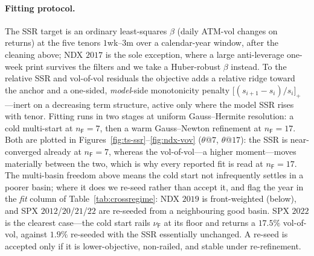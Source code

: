 \documentclass[11pt]{article}
\begin{document}
\paragraph{Fitting protocol.} The SSR target is an ordinary least-squares $\beta$ (daily ATM-vol changes on
returns) at the five tenors $1$wk--$3$m over a calendar-year window, after the cleaning above; NDX $2017$ is the
sole exception, where a large anti-leverage one-week print survives the filters and we take a Huber-robust
$\beta$ instead. To the relative SSR and vol-of-vol residuals the objective adds a relative ridge toward the
anchor and a one-sided, \emph{model}-side monotonicity penalty $\big[(s_{i+1}-s_i)/s_i\big]_+$---inert on a
decreasing term structure, active only where the model SSR rises with tenor. Fitting runs in two stages at
uniform Gauss--Hermite resolution: a cold multi-start at $n_{\mathsf F}{=}7$, then a warm Gauss--Newton
refinement at $n_{\mathsf F}{=}17$. Both are plotted in Figures~\ref{fig:ts-ssr}--\ref{fig:ndx-vov}
($\theta$@$7$, $\theta$@$17$): the SSR is near-converged already at $n_{\mathsf F}{=}7$, whereas the
vol-of-vol---a higher moment---moves materially between the two, which is why every reported fit is read at
$n_{\mathsf F}{=}17$. The multi-basin freedom above means the cold start not infrequently settles in a poorer
basin; where it does we re-seed rather than accept it, and flag the year in the \emph{fit} column of
Table~\ref{tab:crossregime}: NDX $2019$ is front-weighted (below), and SPX $2012$/$20$/$21$/$22$ are re-seeded
from a neighbouring good basin. SPX $2022$ is the clearest case---the cold start rails $\nu_{\mathsf F}$ at its
floor and returns a $17.5\%$ vol-of-vol, against $1.9\%$ re-seeded with the SSR essentially unchanged. A re-seed
is accepted only if it is lower-objective, non-railed, and stable under re-refinement.
\end{document}
